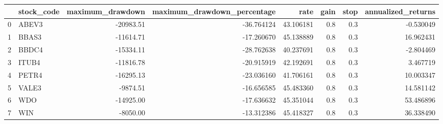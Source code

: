 \begin{tabular}{llrrrrrr}
\toprule
{} & stock\_code &  maximum\_drawdown &  maximum\_drawdown\_percentage &       rate &  gain &  stop &  annualized\_returns \\
\midrule
0 &      ABEV3 &         -20983.51 &                   -36.764124 &  43.106181 &   0.8 &   0.3 &           -0.530049 \\
1 &      BBAS3 &         -11614.71 &                   -17.260670 &  45.138889 &   0.8 &   0.3 &           16.962431 \\
2 &      BBDC4 &         -15334.11 &                   -28.762638 &  40.237691 &   0.8 &   0.3 &           -2.804469 \\
3 &      ITUB4 &         -11816.78 &                   -20.915919 &  42.192691 &   0.8 &   0.3 &            3.467719 \\
4 &      PETR4 &         -16295.13 &                   -23.036160 &  41.706161 &   0.8 &   0.3 &           10.003347 \\
5 &      VALE3 &          -9874.51 &                   -16.656585 &  45.483360 &   0.8 &   0.3 &           14.581142 \\
6 &        WDO &         -14925.00 &                   -17.636632 &  45.351044 &   0.8 &   0.3 &           53.486896 \\
7 &        WIN &          -8050.00 &                   -13.312386 &  45.418327 &   0.8 &   0.3 &           36.338490 \\
\bottomrule
\end{tabular}
